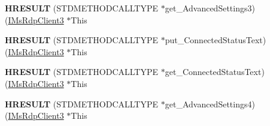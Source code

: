 \begin{DoxyCompactItemize}
\item 
\mbox{\label{struct_m_s_t_s_c_lib_1_1_i_ms_rdp_client3_vtbl_a04d2a2ed517ec66072ab3392cdd9c0b9}} 
{\bfseries H\+R\+E\+S\+U\+LT} (S\+T\+D\+M\+E\+T\+H\+O\+D\+C\+A\+L\+L\+T\+Y\+PE $\ast$get\+\_\+\+Advanced\+Settings3)(\hyperlink{interface_m_s_t_s_c_lib_1_1_i_ms_rdp_client3}{I\+Ms\+Rdp\+Client3} $\ast$This
\item 
\mbox{\label{struct_m_s_t_s_c_lib_1_1_i_ms_rdp_client3_vtbl_a5dde92750cef97775ca1dda9b2cc8c61}} 
{\bfseries H\+R\+E\+S\+U\+LT} (S\+T\+D\+M\+E\+T\+H\+O\+D\+C\+A\+L\+L\+T\+Y\+PE $\ast$put\+\_\+\+Connected\+Status\+Text)(\hyperlink{interface_m_s_t_s_c_lib_1_1_i_ms_rdp_client3}{I\+Ms\+Rdp\+Client3} $\ast$This
\item 
\mbox{\label{struct_m_s_t_s_c_lib_1_1_i_ms_rdp_client3_vtbl_ab173888b2fbec48f0e23cc3ca13c679d}} 
{\bfseries H\+R\+E\+S\+U\+LT} (S\+T\+D\+M\+E\+T\+H\+O\+D\+C\+A\+L\+L\+T\+Y\+PE $\ast$get\+\_\+\+Connected\+Status\+Text)(\hyperlink{interface_m_s_t_s_c_lib_1_1_i_ms_rdp_client3}{I\+Ms\+Rdp\+Client3} $\ast$This
\item 
\mbox{\label{struct_m_s_t_s_c_lib_1_1_i_ms_rdp_client3_vtbl_abe29c571eb391b4d11983e2702a3319b}} 
{\bfseries H\+R\+E\+S\+U\+LT} (S\+T\+D\+M\+E\+T\+H\+O\+D\+C\+A\+L\+L\+T\+Y\+PE $\ast$get\+\_\+\+Advanced\+Settings4)(\hyperlink{interface_m_s_t_s_c_lib_1_1_i_ms_rdp_client3}{I\+Ms\+Rdp\+Client3} $\ast$This
\end{DoxyCompactItemize}

